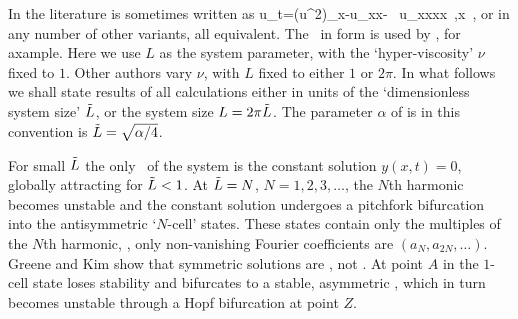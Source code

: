 
In the literature  is sometimes written as
\beq
    u_t=(u^2)_x-u_{xx}- \nu \, u_{xxxx}
    \,,\qquad   x \in [0,L]
    \,,
or in any number of other variants, all equivalent.
The \KSe\ in  form  is used by
\cite{cross93,Mks86,ks04com}, for axample.
Here we use $L$ as the system parameter, with the
`hyper-viscosity' $\nu$ fixed to $1$.
Other authors vary  $\nu$, with $L$ fixed to either $1$ or $2\pi$.
In what follows we shall state results of all
calculations either in units of the `dimensionless system size' $\tilde{L}$,
or the system size $L = 2 \pi \tilde{L}$. The parameter $\alpha$
of  is in this convention is
$\tilde{L}=\sqrt{\alpha/4}$.


For small $\tilde{L}$ the only \eqv\ of the system is the
constant solution $y(x,t)=0$, globally attracting
for $\tilde{L}<1$. At $\tilde{L}=N$, $N=1,2,3, \dots$,
the $N$th harmonic becomes unstable and the constant solution
undergoes a pitchfork bifurcation into
the antisymmetric `$N$-cell' states.
These states contain only the multiples of the $N$th
harmonic, {\ie}, only non-vanishing Fourier coefficients
are $(a_N,a_{2N},\dots)$.
Greene and Kim show that symmetric solutions are \eqva, not \reqva.
At point $A$ in 
the $1$-cell state loses stability
and bifurcates to a stable,
asymmetric \reqv, which in turn becomes unstable
through a Hopf bifurcation at point $Z$.



